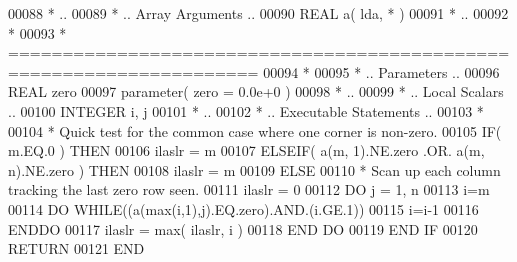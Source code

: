 \begin{DoxyCode}
00088 \textcolor{comment}{*     ..}
00089 \textcolor{comment}{*     .. Array Arguments ..}
00090       \textcolor{keywordtype}{REAL}               a( lda, * )
00091 \textcolor{comment}{*     ..}
00092 \textcolor{comment}{*}
00093 \textcolor{comment}{*  =====================================================================}
00094 \textcolor{comment}{*}
00095 \textcolor{comment}{*     .. Parameters ..}
00096       \textcolor{keywordtype}{REAL}             zero
00097       parameter( zero = 0.0e+0 )
00098 \textcolor{comment}{*     ..}
00099 \textcolor{comment}{*     .. Local Scalars ..}
00100       \textcolor{keywordtype}{INTEGER} i, j
00101 \textcolor{comment}{*     ..}
00102 \textcolor{comment}{*     .. Executable Statements ..}
00103 \textcolor{comment}{*}
00104 \textcolor{comment}{*     Quick test for the common case where one corner is non-zero.}
00105       \textcolor{keywordflow}{IF}( m.EQ.0 ) \textcolor{keywordflow}{THEN}
00106          ilaslr = m
00107       \textcolor{keywordflow}{ELSEIF}( a(m, 1).NE.zero .OR. a(m, n).NE.zero ) \textcolor{keywordflow}{THEN}
00108          ilaslr = m
00109       \textcolor{keywordflow}{ELSE}
00110 \textcolor{comment}{*     Scan up each column tracking the last zero row seen.}
00111          ilaslr = 0
00112          \textcolor{keywordflow}{DO} j = 1, n
00113             i=m
00114             \textcolor{keywordflow}{DO} \textcolor{keywordflow}{WHILE}((a(max(i,1),j).EQ.zero).AND.(i.GE.1))
00115                i=i-1
00116 \textcolor{keywordflow}{            ENDDO}
00117             ilaslr = max( ilaslr, i )
00118 \textcolor{keywordflow}{         END DO}
00119 \textcolor{keywordflow}{      END IF}
00120       \textcolor{keywordflow}{RETURN}
00121 \textcolor{keyword}{      END}
\end{DoxyCode}
